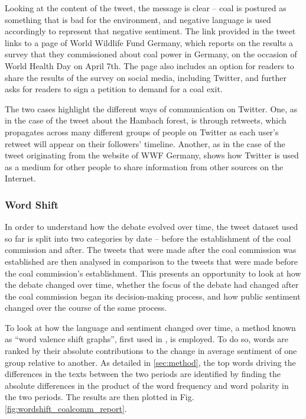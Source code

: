 \documentclass[12pt,onecolumn,twoside]{layout}
\begin{document}
Looking at the content of the tweet, the message is clear -- coal is postured as something that is bad for the environment, and negative language is used accordingly to represent that negative sentiment. The link provided in the tweet links to a page of World Wildlife Fund Germany, which reports on the results a survey that they commissioned about coal power in Germany, on the occasion of World Health Day on April 7th. The page also includes an option for readers to share the results of the survey on social media, including Twitter, and further asks for readers to sign a petition to demand for a coal exit. 

The two cases highlight the different ways of communication on Twitter. One, as in the case of the tweet about the Hambach forest, is through retweets, which propagates across many different groups of people on Twitter as each user's retweet will appear on their followers' timeline. Another, as in the case of the tweet originating from the website of WWF Germany, shows how Twitter is used as a medium for other people to share information from other sources on the Internet. 

\subsubsection*{Word Shift}
In order to understand how the debate evolved over time, the tweet dataset used so far is split into two categories by date -- before the establishment of the coal commission and after. The tweets that were made after the coal commission was established are then analysed in comparison to the tweets that were made before the coal commission's establishment. This presents an opportunity to look at how the debate changed over time, whether the focus of the debate had changed after the coal commission began its decision-making process, and how public sentiment changed over the course of the same process. 

To look at how the language and sentiment changed over time, a method known as ``word valence shift graphs'', first used in \cite{Dodds2011}, is employed. To do so, words are ranked by their absolute contributions to the change in average sentiment of one group relative to another. As detailed in \ref{sec:method}, the top words driving the differences in the texts between the two periods are identified by finding the absolute differences in the product of the word frequency and word polarity in the two periods. The results are then plotted in Fig. \ref{fig:wordshift_coalcomm_report}. 
\end{document}
